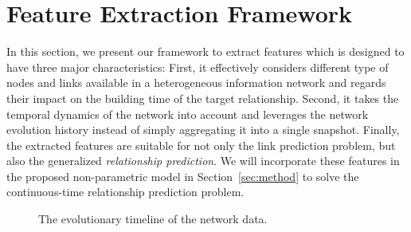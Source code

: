 \section{Feature Extraction Framework}\label{sec:features}

In this section, we present our framework to extract features which is designed to have three major characteristics: First, it effectively considers different type of nodes and links available in a heterogeneous information network and regards their impact on the building time of the target relationship. Second, it takes the temporal dynamics of the network into account and leverages the network evolution history instead of simply aggregating it into a single snapshot. Finally, the extracted features are suitable for not only the link prediction problem, but also the generalized \emph{relationship prediction}. We will incorporate these features in the proposed non-parametric model in Section~\ref{sec:method} to solve the continuous-time relationship prediction problem.

\begin{figure}
	\begin{chronology}[align=left, startyear=0,stopyear=200, width=\columnwidth, height=1pt, startdate=false, stopdate=false, arrowwidth=4pt, arrowheight=3pt]
		\footnotesize
	\end{chronology}
	\caption{The evolutionary timeline of the network data.}
	\label{fig:timeline}
\end{figure}

